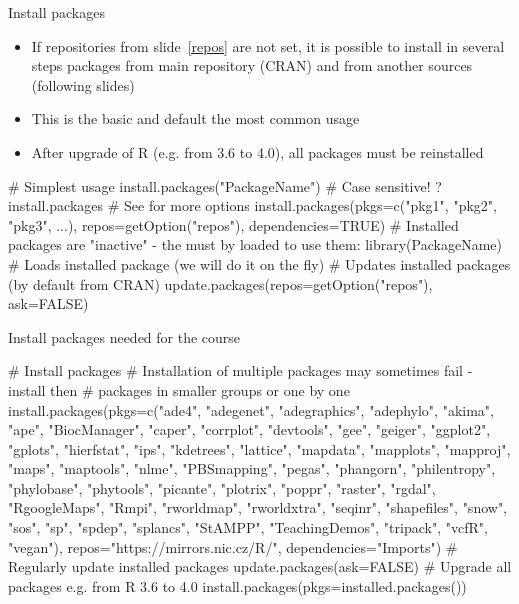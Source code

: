 \documentclass[compress, ucs, xelatex, 11pt, xcolor=svgnames, aspectratio=169,
	hyperref={
		bookmarks=true,
		unicode=true,
		colorlinks=true,
		pdftitle={Molecular data in R},
		plainpages=false,
		pdfauthor={Vojtech Zeisek},
		pdfsubject={Course about phylogeny and evolution in R},
		pdfcreator={XeLaTeX},
		pdfkeywords={R, evolution, phylogeny, molecular data},
		linkcolor=Crimson, %
		anchorcolor=Magenta, %
		citecolor=Magenta, %
		filecolor=Magenta, %
		menucolor=Magenta, %
		urlcolor=DodgerBlue, %
		pdftex},
	url={hyphens, lowtilde} %
	]{beamer}
\begin{document}
\begin{frame}[fragile]{Install packages}
	\begin{itemize}
		\item If repositories from slide~\ref{repos} are not set, it is possible to install in several steps packages from main repository (CRAN) and from another sources (following slides)
		\item This is the basic and default the most common usage
		\item After upgrade of R (e.g. from 3.6 to 4.0), all packages must be reinstalled
	\end{itemize}
	\begin{spluscode}
    # Simplest usage
    install.packages("PackageName") # Case sensitive!
    ?install.packages # See for more options
    install.packages(pkgs=c("pkg1", "pkg2", "pkg3", ...),
      repos=getOption("repos"), dependencies=TRUE)
    # Installed packages are "inactive" - the must by loaded to use them:
    library(PackageName) # Loads installed package (we will do it on the fly)
    # Updates installed packages (by default from CRAN)
    update.packages(repos=getOption("repos"), ask=FALSE)
	\end{spluscode}
\end{frame}

\begin{frame}[fragile]{Install packages needed for the course}
	\begin{spluscode}
    # Install packages
    # Installation of multiple packages may sometimes fail - install then
    # packages in smaller groups or one by one
    install.packages(pkgs=c("ade4", "adegenet", "adegraphics", "adephylo",
      "akima", "ape", "BiocManager", "caper", "corrplot", "devtools",
      "gee", "geiger", "ggplot2", "gplots", "hierfstat", "ips", "kdetrees",
      "lattice", "mapdata", "mapplots", "mapproj", "maps", "maptools",
      "nlme", "PBSmapping", "pegas", "phangorn", "philentropy", "phylobase",
      "phytools", "picante", "plotrix", "poppr", "raster", "rgdal",
      "RgoogleMaps", "Rmpi", "rworldmap",  "rworldxtra", "seqinr",
      "shapefiles", "snow", "sos", "sp", "spdep", "splancs", "StAMPP",
      "TeachingDemos", "tripack", "vcfR", "vegan"),
      repos="https://mirrors.nic.cz/R/", dependencies="Imports")
    # Regularly update installed packages
    update.packages(ask=FALSE)
    # Upgrade all packages e.g. from R 3.6 to 4.0
    install.packages(pkgs=installed.packages())
	\end{spluscode}
\end{frame}
\end{document}
